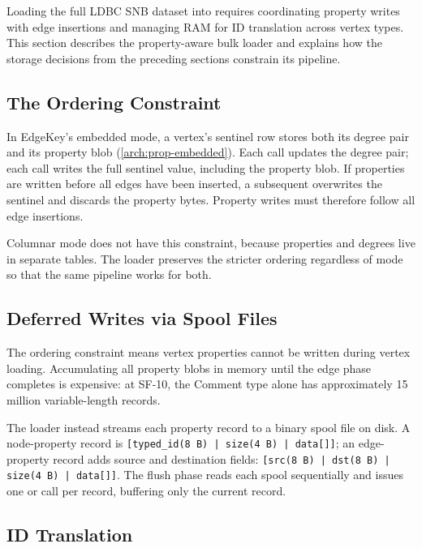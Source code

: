 Loading the full LDBC SNB dataset into \project{} requires coordinating property writes with edge insertions and managing RAM for ID translation across vertex types.
This section describes the property-aware bulk loader and explains how the storage decisions from the preceding sections constrain its pipeline.

\subsection{The Ordering Constraint}
\label{arch:prop-bulk:ordering}

In EdgeKey's embedded mode, a vertex's sentinel row stores both its degree pair and its property blob (\autoref{arch:prop-embedded}).
Each  call updates the degree pair; each  call writes the full sentinel value, including the property blob.
If properties are written before all edges have been inserted, a subsequent  overwrites the sentinel and discards the property bytes.
Property writes must therefore follow all edge insertions.

Columnar mode does not have this constraint, because properties and degrees live in separate tables.
The loader preserves the stricter ordering regardless of mode so that the same pipeline works for both.

\subsection{Deferred Writes via Spool Files}
\label{arch:prop-bulk:spool}

The ordering constraint means vertex properties cannot be written during vertex loading.
Accumulating all property blobs in memory until the edge phase completes is expensive: at SF-10, the Comment type alone has approximately 15 million variable-length records.

The loader instead streams each property record to a binary spool file on disk.
A node-property record is \texttt{[typed\_id(8\,B)\,|\,size(4\,B)\,|\,data[]]};
an edge-property record adds source and destination fields: \texttt{[src(8\,B)\,|\,dst(8\,B)\,|\,size(4\,B)\,|\,data[]]}.
The flush phase reads each spool sequentially and issues one  or  call per record, buffering only the current record.

\subsection{ID Translation}
\label{arch:prop-bulk:id-map}

